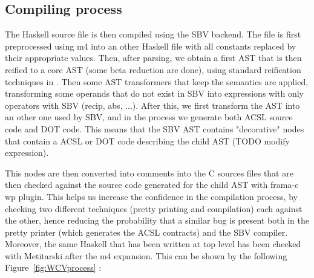 \subsection{Compiling process}

The Haskell source file is then compiled using the SBV backend. The file is first preprocessed using m4 into an other Haskell file with all constants replaced by their appropriate values. Then, after parsing, we obtain a first AST that is then reified to a core AST (some beta reduction are done), using standard reification techniques in \cite{Copilot06}. Then some AST transformers that keep the semantics are applied, transforming some operands that do not exist in SBV into expressions with only operators with SBV (recip, abs, ...). After this, we first transform the AST into an other one used by SBV, and in the process we generate both ACSL source code and DOT code. This means that the SBV AST contains "decorative" nodes that contain a ACSL or DOT code describing the child AST (TODO modify expression). 

This nodes are then converted into comments into the C sources files that are then checked against the source code generated for the child AST with frama-c wp plugin. This helps us increase the confidence in the compilation process, by checking two different techniques (pretty printing and compilation) each against the other, hence reducing the probability that a similar bug is present both in the pretty printer (which generates the ACSL contracts) and the SBV compiler. Moreover, the same Haskell that has been written at top level has been checked with Metitarski after the m4 expansion. This can be shown by the following Figure~\ref{fig:WCVprocess} :


